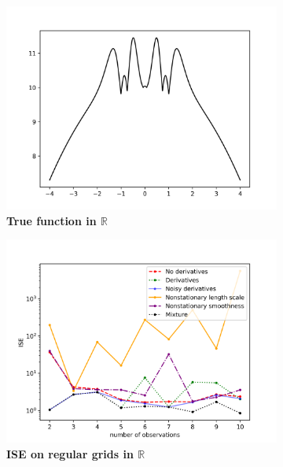 \documentclass{article}
\newcommand{\R}{\mathbb{R}}
\numberwithin{equation}{section}
\begin{document}
\begin{figure}
		\centering
		\captionsetup{justification=centering}
    \begin{subfigure}[t]{.33\textwidth}
      \centering
      \includegraphics[scale=0.35]{figures/crazy.png}
      \caption{\textbf{True function in $\R$}}
    \end{subfigure}%
    \begin{subfigure}[t]{.33\textwidth}
      \centering
      \includegraphics[scale=0.35]{figures/crazy-1D.png}
      \caption{\textbf{ISE on regular grids in $\R$}}
    \end{subfigure}%
    \begin{subfigure}[t]{.33\textwidth}
      \centering

\end{subfigure}
\end{figure}
\end{document}
